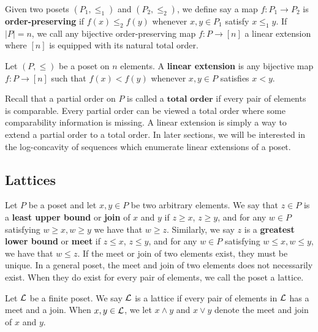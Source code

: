 \documentclass{puthesis-UG}
\begin{document}
Given two posets $(P_1, \leq_1)$ and $(P_2, \leq_2)$, we define say a map $f : P_1 \to P_2$ is \textbf{order-preserving} if $f(x) \leq_2 f(y)$ whenever $x, y \in P_1$ satisfy $x \leq_1 y$. If $|P| = n$, we call any bijective order-preserving map $f : P \to [n]$ a linear extension where $[n]$ is equipped with its natural total order. 

\begin{defn} \label{defn:linear-extension}
	Let $(P, \leq)$ be a poset on $n$ elements. A \textbf{linear extension} is any bijective map $f : P \to [n]$ such that $f(x) < f(y)$ whenever $x, y \in P$ satisfies $x < y$.
\end{defn}

Recall that a partial order on $P$ is called a $\textbf{total order}$ if every pair of elements is comparable. Every partial order can be viewed a total order where some comparability information is missing. A linear extension is simply a way to extend a partial order to a total order. In later sections, we will be interested in the log-concavity of sequences which enumerate linear extensions of a poset.

\subsection{Lattices}

Let $P$ be a poset and let $x, y \in P$ be two arbitrary elements. We say that $z \in P$ is a \textbf{least upper bound} or \textbf{join} of $x$ and $y$ if $z \geq x$, $z \geq y$, and for any $w \in P$ satisfying $w \geq x, w \geq y$ we have that $w \geq z$. Similarly, we say $z$ is a \textbf{greatest lower bound} or \textbf{meet} if $z \leq x$, $z \leq y$, and for any $w \in P$ satisfying $w \leq x, w \leq y$, we have that $w \leq z$. If the meet or join of two elements exist, they must be unique. In a general poset, the meet and join of two elements does not necessarily exist. When they do exist for every pair of elements, we call the poset a lattice. 

\begin{defn} \label{defn:lattice}
	Let $\mathcal{L}$ be a finite poset. We say $\mathcal{L}$ is a lattice if every pair of elements in $\mathcal{L}$ has a meet and a join. When $x, y \in \mathcal{L}$, we let $x \wedge y$  and $x \vee y$ denote the meet and join of $x$ and $y$. 
\end{defn}
\end{document}
